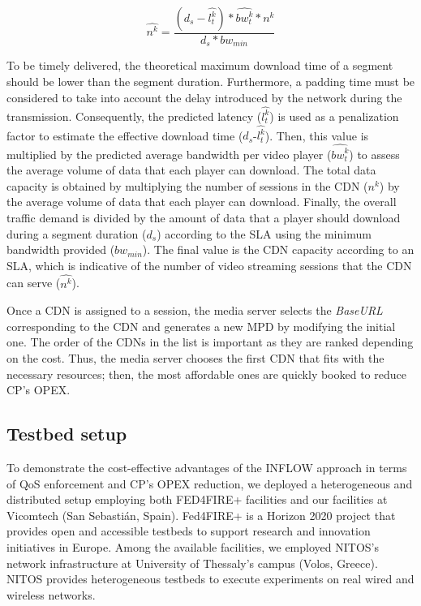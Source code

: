\begin{equation}
\label{eq:IEEETBC2020players}
\widehat{n^{k}} = \frac{(d_{s}-\widehat{{l}_{t}^{k}})*\widehat{{bw}_{t}^{k}}*n^{k}}{d_{s}*bw_{min}}
\end{equation}

To be timely delivered, the theoretical maximum download time of a segment should be lower than the segment duration. Furthermore, a padding time must be considered to take into account the delay introduced by the network during the transmission. Consequently, the predicted latency ($\widehat{{l}_{t}^{k}}$) is used as a penalization factor to estimate the effective download time ($d_{s}$-$\widehat{{l}_{t}^{k}}$). Then, this value is multiplied by the predicted average bandwidth per video player ($\widehat{{bw}_{t}^{k}}$) to assess the average volume of data that each player can download. The total data capacity is obtained by multiplying the number of sessions in the CDN ($n^{k}$) by the average volume of data that each player can download. Finally, the overall traffic demand is divided by the amount of data that a player should download during a segment duration ($d_{s}$) according to the SLA using the minimum bandwidth provided ($bw_{min}$). The final value is the CDN capacity according to an SLA, which is indicative of the number of video streaming sessions that the CDN can serve ($\widehat{n^{k}}$).

Once a CDN is assigned to a session, the media server selects the \textit{BaseURL} corresponding to the CDN and generates a new MPD by modifying the initial one. The order of the CDNs in the list is important as they are ranked depending on the cost. Thus, the media server chooses the first CDN that fits with the necessary resources; then, the most affordable ones are quickly booked to reduce CP's OPEX.

\subsection{Testbed setup}
\label{sec:setup}

To demonstrate the cost-effective advantages of the INFLOW approach in terms of QoS enforcement and CP's OPEX reduction, we deployed a heterogeneous and distributed setup employing both FED4FIRE+ facilities \cite{nussbaum2019} and our facilities at Vicomtech (San Sebastián, Spain). Fed4FIRE+ is a Horizon 2020 project that provides open and accessible testbeds to support research and innovation initiatives in Europe. Among the available facilities, we employed NITOS's network infrastructure \cite{makris2015} at University of Thessaly's campus (Volos, Greece). NITOS provides heterogeneous testbeds to execute experiments on real wired and wireless networks.

